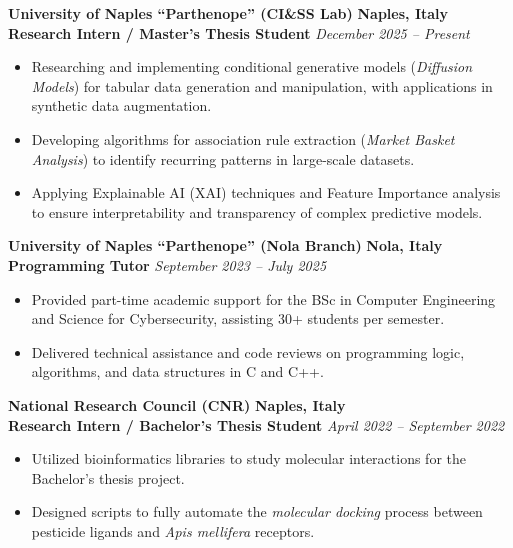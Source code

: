 \documentclass[10pt,a4paper]{article}
\begin{document}
\noindent
{\normalsize\textbf{\textcolor{primary}{University of Naples ``Parthenope'' (CI\&SS Lab)}}} \hfill \textbf{\small Naples, Italy}\\
{\small\textbf{\textcolor{accent}{Research Intern / Master's Thesis Student}}} \hfill {\small\textit{\textcolor{secondary}{December 2025 -- Present}}}
\begin{itemize}\small
  \item Researching and implementing conditional generative models (\textit{Diffusion Models}) for tabular data generation and manipulation, with applications in synthetic data augmentation.
  \item Developing algorithms for association rule extraction (\textit{Market Basket Analysis}) to identify recurring patterns in large-scale datasets.
  \item Applying Explainable AI (XAI) techniques and Feature Importance analysis to ensure interpretability and transparency of complex predictive models.
\end{itemize}

\vspace{2pt}\noindent
{\normalsize\textbf{\textcolor{primary}{University of Naples ``Parthenope'' (Nola Branch)}}} \hfill \textbf{\small Nola, Italy}\\
{\small\textbf{\textcolor{accent}{Programming Tutor}}} \hfill {\small\textit{\textcolor{secondary}{September 2023 -- July 2025}}}
\begin{itemize}\small
  \item Provided part-time academic support for the BSc in Computer Engineering and Science for Cybersecurity, assisting 30+ students per semester.
  \item Delivered technical assistance and code reviews on programming logic, algorithms, and data structures in C and C++.
\end{itemize}

\vspace{2pt}\noindent
{\normalsize\textbf{\textcolor{primary}{National Research Council (CNR)}}} \hfill \textbf{\small Naples, Italy}\\
{\small\textbf{\textcolor{accent}{Research Intern / Bachelor's Thesis Student}}} \hfill {\small\textit{\textcolor{secondary}{April 2022 -- September 2022}}}
\begin{itemize}\small
  \item Utilized bioinformatics libraries to study molecular interactions for the Bachelor's thesis project.
  \item Designed scripts to fully automate the \textit{molecular docking} process between pesticide ligands and \textit{Apis mellifera} receptors.
\end{itemize}
\end{document}
